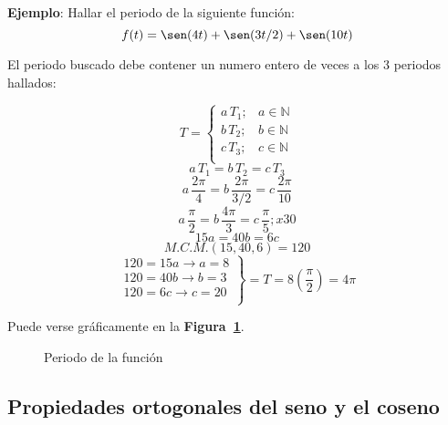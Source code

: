 \textbf{Ejemplo}: Hallar el periodo de la siguiente función:
\begin{equation*}
    f(t)=\sen(4t)+\sen(3t/2)+\sen(10t)
\end{equation*}

El periodo buscado debe contener un numero entero de veces a los 3 periodos
hallados:

\begin{equation*}
    T=\begin{cases}
        a\,T_1; & a\in\mathbb{N}\\
        b\,T_2; & b\in\mathbb{N}\\
        c\,T_3; & c\in\mathbb{N}\\
    \end{cases}
\end{equation*}
\begin{equation*}
    a\,T_1=b\,T_2=c\,T_3
\end{equation*}
\begin{equation*}
    a\,\frac{2\pi}{4}=b\,\frac{2\pi}{3/2}=c\,\frac{2\pi}{10}
\end{equation*}
\begin{equation*}
    a\,\frac{\pi}{2}=b\,\frac{4\pi}{3}=c\,\frac{\pi}{5};x30
\end{equation*}
\begin{equation*}
    15a=40b=6c
\end{equation*}
\begin{equation*}
    M.C.M.(15,40,6)=120
\end{equation*}
\begin{equation*}
\left.\begin{aligned}
    120=15a\rightarrow a=8\\
    120=40b\rightarrow b=3\\
    120=6c\rightarrow c=20\\
\end{aligned}\right\}=T=8\left(\frac{\pi}{2}\right)=4\pi
\end{equation*}

Puede verse gráficamente en la \textbf{Figura~\ref{figura_06}}.

\begin{figure}[H]
    \centering
    
    \caption{Periodo de la función}\label{figura_06}
\end{figure}

\subsection{Propiedades ortogonales del seno y el coseno}

